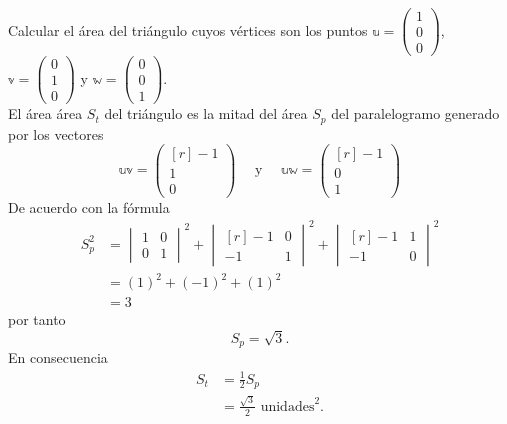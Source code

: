 \begin{example}
    Calcular el área del triángulo cuyos vértices son los puntos $\mathbb{u} = \begin{pmatrix}
        1 \\
        0 \\
        0
    \end{pmatrix}$, $\mathbb{v} = \begin{pmatrix}
        0 \\
        1 \\
        0
    \end{pmatrix}$ y $\mathbb{w} = \begin{pmatrix}
        0 \\
        0 \\
        1
    \end{pmatrix}$. \\
    \solucion El área área $S_t$ del triángulo es la mitad del área $S_p$ del paralelogramo generado por los vectores
    $$\mathbb{u} \mathbb{v} = \begin{pmatrix*}[r]
        -1 \\
        1 \\
        0
    \end{pmatrix*} \quad\text{ y }\quad \mathbb{u} \mathbb{w} = \begin{pmatrix*}[r]
        -1 \\
        0 \\
        1
    \end{pmatrix*}$$
    De acuerdo con la fórmula
    $$
    \begin{aligned}
        S_p^2 & =\begin{vmatrix}
        1 & 0 \\
        0 & 1
        \end{vmatrix}^2+\begin{vmatrix*}[r]
        -1 & 0 \\
        -1 & 1
        \end{vmatrix*}^2+\begin{vmatrix*}[r]
        -1 & 1 \\
        -1 & 0
        \end{vmatrix*}^2 \\
        & = (1)^2+(-1)^2+(1)^2 \\
        & =3
    \end{aligned}
    $$
    por tanto
    $$S_p=\sqrt{3}.$$
    En consecuencia
    \begin{align*}
        S_t &=\frac{1}{2} S_p \\ 
        &=\frac{\sqrt{3}}{2} \text{ unidades}^2.
    \end{align*}
\end{example}

